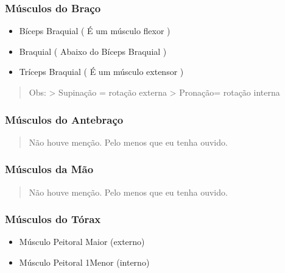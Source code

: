 \documentclass[
]{book}
\providecommand{\tightlist}{%
  \setlength{\itemsep}{0pt}\setlength{\parskip}{0pt}}
\begin{document}
\hypertarget{muxfasculos-do-brauxe7o-1}{%
\subsubsection{Músculos do Braço}\label{muxfasculos-do-brauxe7o-1}}

\begin{itemize}
\tightlist
\item
  Bíceps Braquial ( É um músculo flexor )
\item
  Braquial ( Abaixo do Bíceps Braquial )
\item
  Tríceps Braquial ( É um músculo extensor )
\end{itemize}

\begin{quote}
Obs:
\textgreater{} Supinação = rotação externa
\textgreater{} Pronação= rotação interna
\end{quote}

\hypertarget{muxfasculos-do-antebrauxe7o}{%
\subsubsection{Músculos do Antebraço}\label{muxfasculos-do-antebrauxe7o}}

\begin{quote}
Não houve menção. Pelo menos que eu tenha ouvido.
\end{quote}

\hypertarget{muxfasculos-da-muxe3o}{%
\subsubsection{Músculos da Mão}\label{muxfasculos-da-muxe3o}}

\begin{quote}
Não houve menção. Pelo menos que eu tenha ouvido.
\end{quote}

\hypertarget{muxfasculos-do-tuxf3rax}{%
\subsubsection{Músculos do Tórax}\label{muxfasculos-do-tuxf3rax}}

\begin{itemize}
\tightlist
\item
  Músculo Peitoral Maior (externo)
\item
  Músculo Peitoral 1Menor (interno)
\end{itemize}
\end{document}
